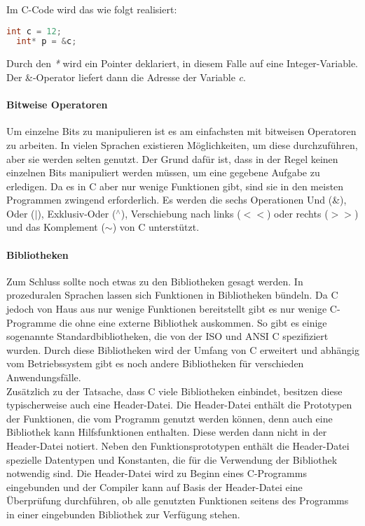   Im C-Code wird das wie folgt realisiert:

  \begin{lstlisting}[language=C]
  int c = 12;
  int* p = &c;
  \end{lstlisting}
  Durch den \emph{*} wird ein Pointer deklariert, in diesem Falle auf eine Integer-Variable. Der \&-Operator
  liefert dann die Adresse der Variable \emph{c}.

  \paragraph{Bitweise Operatoren}
  Um einzelne Bits zu manipulieren ist es am einfachsten mit bitweisen Operatoren zu arbeiten. In vielen
  Sprachen existieren Möglichkeiten, um diese durchzuführen, aber sie werden selten genutzt. Der Grund
  dafür ist, dass in der Regel keinen einzelnen Bits manipuliert werden müssen, um eine gegebene Aufgabe
  zu erledigen. Da es in C aber nur wenige Funktionen gibt, sind sie in den meisten Programmen zwingend
  erforderlich. Es werden die sechs Operationen Und (\&), Oder ($|$), Exklusiv-Oder ($^{\wedge}$), Verschiebung nach
  links ($<<$) oder rechts ($>>$) und das Komplement ($\sim$) von C unterstützt.

  \paragraph{Bibliotheken}
  Zum Schluss sollte noch etwas zu den Bibliotheken gesagt werden. In prozeduralen Sprachen lassen sich
  Funktionen in Bibliotheken bündeln. Da C jedoch von Haus aus nur wenige Funktionen bereitstellt gibt es
  nur wenige C-Programme die ohne eine externe Bibliothek auskommen. So gibt es einige sogenannte
  Standardbibliotheken, die von der ISO und ANSI C spezifiziert wurden. Durch diese
  Bibliotheken wird der Umfang von C erweitert und abhängig vom Betriebssystem gibt es noch andere
  Bibliotheken für verschieden Anwendungsfälle. \\
  Zusätzlich zu der Tatsache, dass C viele Bibliotheken einbindet, besitzen diese typischerweise auch
  eine Header-Datei. Die Header-Datei enthält die Prototypen der Funktionen, die vom Programm genutzt
  werden können, denn auch eine Bibliothek kann Hilfsfunktionen enthalten. Diese werden dann nicht in
  der Header-Datei notiert. Neben den Funktionsprototypen enthält die Header-Datei spezielle
  Datentypen und Konstanten, die für die Verwendung der Bibliothek notwendig sind. Die Header-Datei wird
  zu Beginn eines C-Programms eingebunden und der Compiler kann auf Basis der Header-Datei eine Überprüfung
  durchführen, ob alle genutzten Funktionen seitens des Programms in einer eingebunden Bibliothek zur
  Verfügung stehen.

